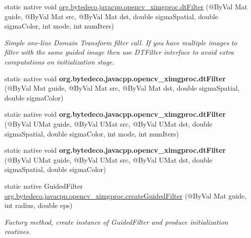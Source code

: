 \begin{DoxyCompactItemize}
\item 
static native void \hyperlink{group__ximgproc__filters_ga7a3f493e82d0571f6a8ed61d005542d9}{org.\+bytedeco.\+javacpp.\+opencv\+\_\+ximgproc.\+dt\+Filter} (@By\+Val Mat guide, @By\+Val Mat src, @By\+Val Mat dst, double sigma\+Spatial, double sigma\+Color, int mode, int num\+Iters)
\begin{DoxyCompactList}\small\item\em Simple one-\/line Domain Transform filter call. If you have multiple images to filter with the same guided image then use D\+T\+Filter interface to avoid extra computations on initialization stage. \end{DoxyCompactList}\item 
\mbox{\label{group__ximgproc__filters_ga1be194e8ed7912193d9648bae6a0665e}} 
static native void {\bfseries org.\+bytedeco.\+javacpp.\+opencv\+\_\+ximgproc.\+dt\+Filter} (@By\+Val Mat guide, @By\+Val Mat src, @By\+Val Mat dst, double sigma\+Spatial, double sigma\+Color)
\item 
\mbox{\label{group__ximgproc__filters_ga8ee3aa0faa0ea78eff03206ab31613c4}} 
static native void {\bfseries org.\+bytedeco.\+javacpp.\+opencv\+\_\+ximgproc.\+dt\+Filter} (@By\+Val U\+Mat guide, @By\+Val U\+Mat src, @By\+Val U\+Mat dst, double sigma\+Spatial, double sigma\+Color, int mode, int num\+Iters)
\item 
\mbox{\label{group__ximgproc__filters_ga92faa12e591b788eb767f163ffabed10}} 
static native void {\bfseries org.\+bytedeco.\+javacpp.\+opencv\+\_\+ximgproc.\+dt\+Filter} (@By\+Val U\+Mat guide, @By\+Val U\+Mat src, @By\+Val U\+Mat dst, double sigma\+Spatial, double sigma\+Color)
\item 
static native Guided\+Filter \hyperlink{group__ximgproc__filters_gaa4f34319223da44cce2ad4e75b776287}{org.\+bytedeco.\+javacpp.\+opencv\+\_\+ximgproc.\+create\+Guided\+Filter} (@By\+Val Mat guide, int radius, double eps)
\begin{DoxyCompactList}\small\item\em Factory method, create instance of Guided\+Filter and produce initialization routines. \end{DoxyCompactList}\item 
\mbox{\label{group__ximgproc__filters_gacb20d4f37cb6dee06c4719f6de83d4af}} 

\end{DoxyCompactItemize}
